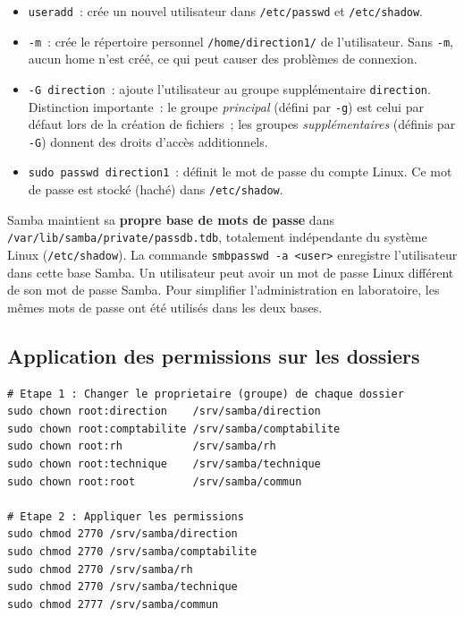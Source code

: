 \documentclass[12pt,a4paper]{article}
\begin{document}
\begin{explainbox}
\begin{itemize}[leftmargin=1.5em,topsep=2pt]
  \item \texttt{useradd}~: crée un nouvel utilisateur dans \texttt{/etc/passwd} et
    \texttt{/etc/shadow}.
  \item \texttt{-m}~: crée le répertoire personnel \texttt{/home/direction1/} de l'utilisateur.
    Sans \texttt{-m}, aucun home n'est créé, ce qui peut causer des problèmes de connexion.
  \item \texttt{-G direction}~: ajoute l'utilisateur au groupe supplémentaire \texttt{direction}.
    Distinction importante~: le groupe \textit{principal} (défini par \texttt{-g}) est celui
    par défaut lors de la création de fichiers~; les groupes \textit{supplémentaires}
    (définis par \texttt{-G}) donnent des droits d'accès additionnels.
  \item \texttt{sudo passwd direction1}~: définit le mot de passe du compte Linux. Ce mot
    de passe est stocké (haché) dans \texttt{/etc/shadow}.
\end{itemize}
\end{explainbox}

\begin{infobox}
Samba maintient sa \textbf{propre base de mots de passe} dans
\texttt{/var/lib/samba/private/passdb.tdb}, totalement indépendante du système Linux
(\texttt{/etc/shadow}). La commande \texttt{smbpasswd -a <user>} enregistre l'utilisateur
dans cette base Samba. Un utilisateur peut avoir un mot de passe Linux différent de son
mot de passe Samba. Pour simplifier l'administration en laboratoire, les mêmes mots de
passe ont été utilisés dans les deux bases.
\end{infobox}

\subsection{Application des permissions sur les dossiers}

\begin{lstlisting}[style=terminal]
# Etape 1 : Changer le proprietaire (groupe) de chaque dossier
sudo chown root:direction    /srv/samba/direction
sudo chown root:comptabilite /srv/samba/comptabilite
sudo chown root:rh           /srv/samba/rh
sudo chown root:technique    /srv/samba/technique
sudo chown root:root         /srv/samba/commun

# Etape 2 : Appliquer les permissions
sudo chmod 2770 /srv/samba/direction
sudo chmod 2770 /srv/samba/comptabilite
sudo chmod 2770 /srv/samba/rh
sudo chmod 2770 /srv/samba/technique
sudo chmod 2777 /srv/samba/commun
\end{lstlisting}
\end{document}
